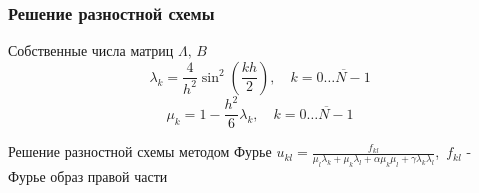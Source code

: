 \documentclass[11pt]{beamer}
\begin{document}
\begin{frame}
\frametitle{Решение разностной схемы}
\begin{block}{Собственные числа матриц $\Lambda,\,B$}
$$
\lambda_k = \frac{4}{h^2} \sin^2(\frac{kh}{2}),\quad k = \overline{0 \ldots N-1}
$$
$$
\mu_k = 1 - \frac{h^2}{6}\lambda_k,\quad k = \overline{0 \ldots N-1}
$$

\end{block}


\begin{block}{Решение разностной схемы методом Фурье}
$u_{kl} = \frac{f_{kl}}{\mu_l \lambda_k + \mu_k \lambda_l + \alpha \mu_k \mu_l + \gamma \lambda_k \lambda_l}$,\,
$f_{kl}$ - Фурье образ правой части
\end{block}
\end{frame}
\end{document}
